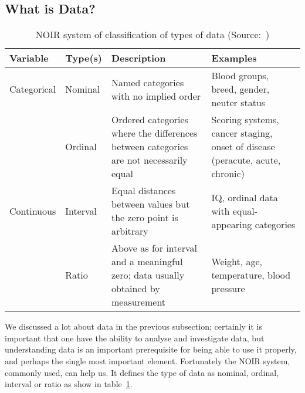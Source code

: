 \subsection{What is Data?}
\begin{table}[ht]
    \begin{tabularx}{\textwidth}{
            | >{\raggedright\arraybackslash} m{1.8cm}
            | >{\raggedright\arraybackslash} m{1.8cm}
            | >{\raggedright\arraybackslash} X
            | >{\raggedright\arraybackslash} X |}
        \toprule
        \hfil\bfseries Variable & \hfil\bfseries Type(s) & \hfil\bfseries Description                                                            & \hfil\bfseries Examples                                                      \\
        \midrule
        Categorical             & Nominal                & Named categories with no implied order                                                & Blood groups, breed, gender, neuter status                                   \\
        ~                       & Ordinal                & Ordered categories where the differences between categories are not necessarily equal & Scoring systems, cancer staging, onset of disease (peracute, acute, chronic) \\
        \midrule
        Continuous              & Interval               & Equal distances between values but the zero point is arbitrary                        & IQ, ordinal data with equal-appearing categories                             \\
        ~                       & Ratio                  & Above as for interval and a meaningful zero; data usually obtained by measurement     & Weight, age, temperature, blood pressure                                     \\
        \bottomrule
    \end{tabularx}
    \caption{NOIR system of classification of types of data (Source:~\cite{Article:intro_to_data_analysis})}
    \label{table:noir_sys}
\end{table}
We discussed a lot about data in the previous subsection; certainly it is important that one have the ability to analyse and investigate data, but
understanding data is an important prerequisite for being able to use it properly, and perhaps the single most important element.
Fortunately the NOIR system, commonly used, can help us. It defines the type of data as nominal, ordinal, interval or ratio as show in table~\ref{table:noir_sys}.

